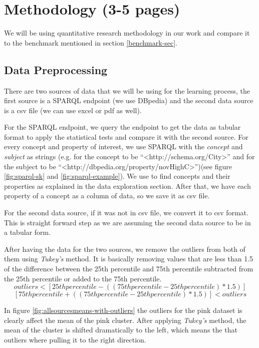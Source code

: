 \documentclass{article}
\newcommand{\comm}[2][inline]{\color{green} #2 \color{black}}
\begin{document}
\section{Methodology (3-5 pages)}
We will be using quantitative research methodology in our work and compare it to the benchmark mentioned in section \ref{benchmark-sec}. %

\subsection{Data Preprocessing} \label{datapreprocessing-sec}



There are two sources of data that we will be using for the learning process, the first source is a SPARQL endpoint \cite{w3c-sparql} (we use DBpedia) and the second data source is a csv file (we can use excel or pdf as well). 

For the SPARQL endpoint, we query the endpoint to get the data as tabular format to apply the statistical tests and compare it with the second source. For every concept and property of interest,%
we use SPARQL with the \textit{concept} and \textit{subject} as strings (e.g. for the concept to be ``\textless http://schema.org/City\textgreater '' and for the subject to be ``\textless http://dbpedia.org/property/novHighC\textgreater'')(see figure \ref{fig:sparql-sk} and \ref{fig:sparql-example}). We use \cite{loupe} to find concepts and their properties as explained in the data exploration section. After that, we have each property of a concept as a column of data, so we save it as csv file.

For the second data source, if it was not in csv file, we convert it to csv format. This is straight forward step as we are assuming the second data source to be in a tabular form. 

After having the data for the two sources, we remove the outliers from both of them using \textit{Tukey\rq s} method. It is basically removing values that are less than 1.5 of the difference between the 25th percentile and 75th percentile subtracted from the 25th percentile or added to the 75th percentile. 
$$ outliers < [25th percentile - ( ( 75th percentile - 25th percentile )*1.5)] $$
$$ [ 75th percentile + ( ( 75th percentile - 25th percentile )*1.5)] < outliers  $$

In figure \ref{fig:allsourcesmeans-with-outliers} the outliers for the pink dataset is clearly affect the mean of the pink cluster. After applying \textit{Tukey\rq s} method, the mean of the cluster is shifted dramatically to the left, which means the that outliers where pulling it to the right direction.
\end{document}
